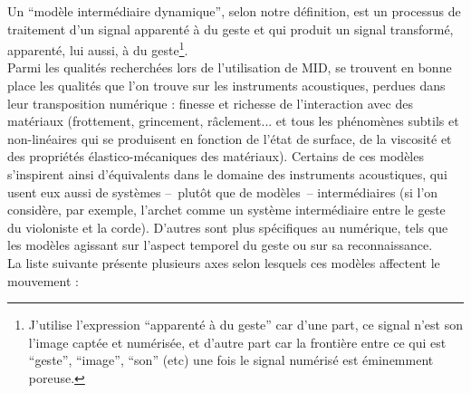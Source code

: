 \noindent Un ``modèle intermédiaire dynamique'', selon notre définition, est un processus de traitement d'un signal apparenté à du geste et qui produit un signal transformé, apparenté, lui aussi, à du geste\footnote{J'utilise l'expression ``apparenté à du geste'' car d'une part, ce signal n'est son l'image captée et numérisée, et d'autre part car la frontière entre ce qui est ``geste'', ``image'', ``son'' (etc) une fois le signal numérisé est éminemment poreuse.}.\\
\indent Parmi les qualités recherchées lors de l'utilisation de MID, se trouvent en bonne place les qualités que l'on trouve sur les instruments acoustiques, perdues dans leur transposition numérique : finesse et richesse de l'interaction avec des matériaux (frottement, grincement, râclement... et tous les phénomènes subtils et non-linéaires qui se produisent en fonction de l'état de surface, de la viscosité et des propriétés élastico-mécaniques des matériaux). Certains de ces modèles s'inspirent ainsi d'équivalents dans le domaine des instruments acoustiques, qui usent eux aussi de systèmes --~plutôt que de modèles~-- intermédiaires (si l'on considère, par exemple, l'archet comme un système intermédiaire entre le geste du violoniste et la corde). D'autres sont plus spécifiques au numérique, tels que les modèles agissant sur l'aspect temporel du geste ou sur sa reconnaissance.\\
\indent La liste suivante présente plusieurs axes selon lesquels ces modèles affectent le mouvement :
\vspace{-1em}
